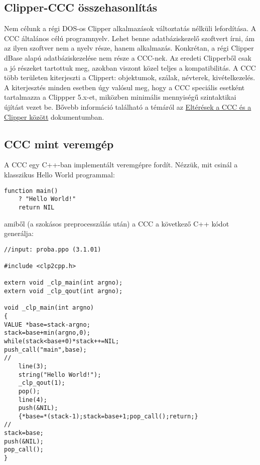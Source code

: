 \subsection{Clipper-CCC összehasonlítás}

Nem célunk a régi DOS-os Clipper alkalmazások változtatás 
nélküli lefordítása. A CCC általános célú programnyelv. 
Lehet benne adatbáziskezelő szoftvert írni, ám az ilyen szoftver 
nem a nyelv része, hanem alkalmazás. Konkrétan, a régi Clipper 
dBase alapú adatbáziskezelése nem része a CCC-nek.
Az eredeti Clipperből csak a jó részeket tartottuk meg, 
azokban viszont közel teljes  a kompatibilitás. 
A CCC több területen kiterjeszti a Clippert:
objektumok, szálak, névterek, kivételkezelés. 
A kiterjesztés minden esetben úgy valósul meg, 
hogy a CCC speciális esetként tartalmazza a Clippper 5.x-et, 
miközben minimális mennyiségű szintaktikai újítást vezet be. 
Bővebb információ található a témáról az
\href{ccc-clipper-elteresek.html}{Eltérések a CCC és a Clipper  között} 
dokumentumban.


\subsection{CCC mint veremgép}

A CCC egy C++-ban implementált veremgépre fordít. 
Nézzük, mit csinál a klasszikus Hello World programmal:
\begin{verbatim}
function main()
    ? "Hello World!"
    return NIL
\end{verbatim}

amiből (a szokásos preprocesszálás után) 
a CCC a következő C++ kódot generálja:

\begin{verbatim}
//input: proba.ppo (3.1.01)

#include <clp2cpp.h>

extern void _clp_main(int argno);
extern void _clp_qout(int argno);

void _clp_main(int argno)
{
VALUE *base=stack-argno;
stack=base+min(argno,0);
while(stack<base+0)*stack++=NIL;
push_call("main",base);
//
    line(3);
    string("Hello World!");
    _clp_qout(1);
    pop();
    line(4);
    push(&NIL);
    {*base=*(stack-1);stack=base+1;pop_call();return;}
//
stack=base;
push(&NIL);
pop_call();
}
\end{verbatim}
 

